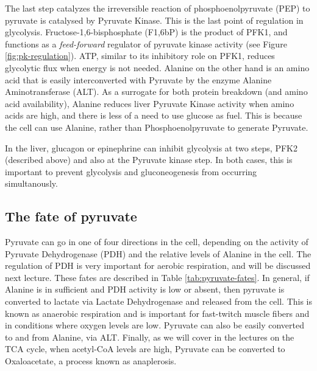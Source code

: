 \documentclass{tufte-handout}
\begin{document}
The last step catalyzes the irreversible reaction of phosphoenolpyruvate (PEP) to pyruvate is catalysed by Pyruvate Kinase.  This is the last point of regulation in glycolysis.    Fructose-1,6-bisphosphate (F1,6bP) is the product of PFK1, and functions as a \emph{feed-forward} regulator of pyruvate kinase activity (see Figure \ref{fig:pk-regulation}).  ATP, similar to its inhibitory role on PFK1, reduces glycolytic flux when energy is not needed.  Alanine on the other hand is an amino acid that is easily interconverted with Pyruvate by the enzyme Alanine Aminotransferase (ALT).  As a surrogate for both protein breakdown (and amino acid availability), Alanine reduces liver Pyruvate Kinase activity when amino acids are high, and there is less of a need to use glucose as fuel.  This is because the cell can use Alanine, rather than Phosphoenolpyruvate to generate Pyruvate.

  In the liver, glucagon or epinephrine can inhibit glycolysis at two steps, PFK2 (described above) and also at the Pyruvate kinase step.  In both cases, this is important to prevent glycolysis and gluconeogenesis from occurring simultanously.

\subsection{The fate of pyruvate}

Pyruvate can go in one of four directions in the cell, depending on the activity of Pyruvate Dehydrogenase (PDH) and the relative levels of Alanine in the cell.  The regulation of PDH is very important for aerobic respiration, and will be discussed next lecture.  These fates are described in Table \ref{tab:pyruvate-fates}.  In general, if Alanine is in sufficient and PDH activity is low or absent, then pyruvate is converted to lactate via Lactate Dehydrogenase and released from the cell.  This is known as anaerobic respiration and is important for fast-twitch muscle fibers and in conditions where oxygen levels are low.  Pyruvate can also be easily converted to and from Alanine, via ALT.  Finally, as we will cover in the lectures on the TCA cycle, when acetyl-CoA levels are high, Pyruvate can be converted to Oxaloacetate, a process known as anaplerosis.
\end{document}

